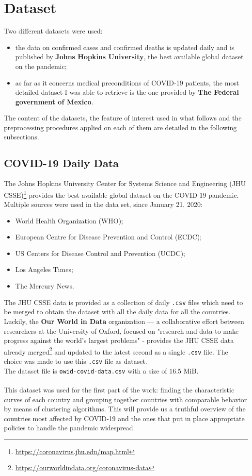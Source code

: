 \documentclass[11pt,a4paper]{article}
\begin{document}
\newpage
\section{Dataset}
Two different datasets were used:
\begin{itemize}
    \item the data on confirmed cases and confirmed deaths is updated daily and
    is published by \textbf{Johns Hopkins University}, the best available global
    dataset on the pandemic;
    \item as far as it concerns medical preconditions of COVID-19 patients,
    the most detailed dataset I was able to retrieve is the one provided by
    \textbf{The Federal government of Mexico}.
\end{itemize}
The content of the datasets, the feature of interest used in what follows and
the preprocessing procedures applied on each of them are detailed in the
following subsections.
\subsection{COVID-19 Daily Data}
The Johns Hopkins University Center for Systems Science and Engineering
(JHU CSSE)\footnote{\url{https://coronavirus.jhu.edu/map.html}} provides the
best available global dataset on the COVID-19 pandemic. Multiple sources were
used in the data set, since January 21, 2020:
\begin{itemize}
    \item World Health Organization (WHO);
    \item European Centre for Disease Prevention and Control (ECDC);
    \item US Centers for Disease Control and Prevention (UCDC);
    \item Los Angeles Times;
    \item The Mercury News.
\end{itemize}
The JHU CSSE data is provided as a collection of daily \texttt{.csv} files which
need to be merged to obtain the dataset with all the daily data for all the
countries. Luckily, the \textbf{Our World in Data} organization --- a
collaborative effort between researchers at the University of Oxford, focused on
"research and data to make progress against the world's largest problems" -
provides the JHU CSSE data already
merged\footnote{\url{https://ourworldindata.org/coronavirus-data}} and updated
to the latest second as a single \texttt{.csv} file. The choice was made to use
this \texttt{.csv} file as dataset.\\
The dataset file is \texttt{owid-covid-data.csv} with a size of $16.5$ MiB.\\
\\
This dataset was used for the first part of the work: finding the characteristic
curves of each country and grouping together countries with comparable behavior
by means of clustering algorithms. This will provide us a truthful overview of
the countries most affected by COVID-19 and the ones that put in place
appropriate policies to handle the pandemic widespread.
\end{document}
